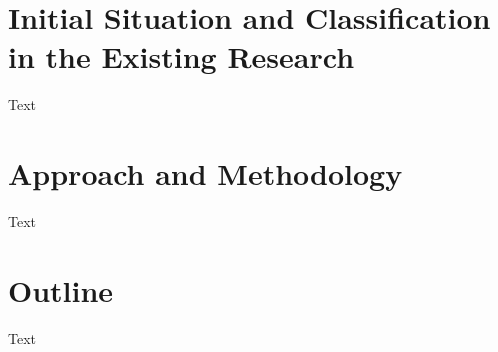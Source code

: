 \section{Initial Situation and Classification in the Existing Research}
Text
\section{Approach and Methodology}
Text
\section{Outline}
Text